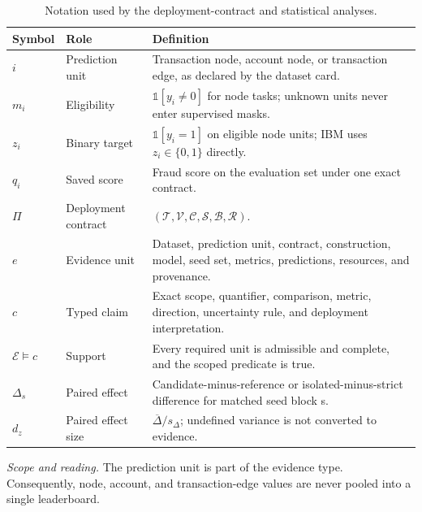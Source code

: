 \begin{table}[tbp]
\centering
\footnotesize
\setlength{\tabcolsep}{3.2pt}
\renewcommand{\arraystretch}{1.12}
\caption{Notation used by the deployment-contract and statistical analyses.}
\label{tab:s-notation}
\begin{tabularx}{\textwidth}{@{}>{\raggedright\arraybackslash}p{} >{\raggedright\arraybackslash}p{} Y@{}}
\toprule
\textbf{Symbol} & \textbf{Role} & \textbf{Definition} \\
\midrule
$i$ & Prediction unit & Transaction node, account node, or transaction edge, as declared by the dataset card. \\
$m_i$ & Eligibility & $\mathbb{1}[y_i\neq0]$ for node tasks; unknown units never enter supervised masks. \\
$z_i$ & Binary target & $\mathbb{1}[y_i=1]$ on eligible node units; IBM uses $z_i\in\{0,1\}$ directly. \\
$q_i$ & Saved score & Fraud score on the evaluation set under one exact contract. \\
$\Pi$ & Deployment contract & $(\mathcal{T},\mathcal{V},\mathcal{C},\mathcal{S},\mathcal{B},\mathcal{R})$. \\
$e$ & Evidence unit & Dataset, prediction unit, contract, construction, model, seed set, metrics, predictions, resources, and provenance. \\
$c$ & Typed claim & Exact scope, quantifier, comparison, metric, direction, uncertainty rule, and deployment interpretation. \\
$\mathcal{E}\models c$ & Support & Every required unit is admissible and complete, and the scoped predicate is true. \\
$\Delta_s$ & Paired effect & Candidate-minus-reference or isolated-minus-strict difference for matched seed block s. \\
$d_z$ & Paired effect size & $\overline{\Delta}/s_{\Delta}$; undefined variance is not converted to evidence. \\
\bottomrule
\end{tabularx}
\vspace{2pt}
\begin{minipage}{\textwidth}\footnotesize\emph{Scope and reading.} The prediction unit is part of the evidence type. Consequently, node, account, and transaction-edge values are never pooled into a single leaderboard.\end{minipage}
\end{table}
